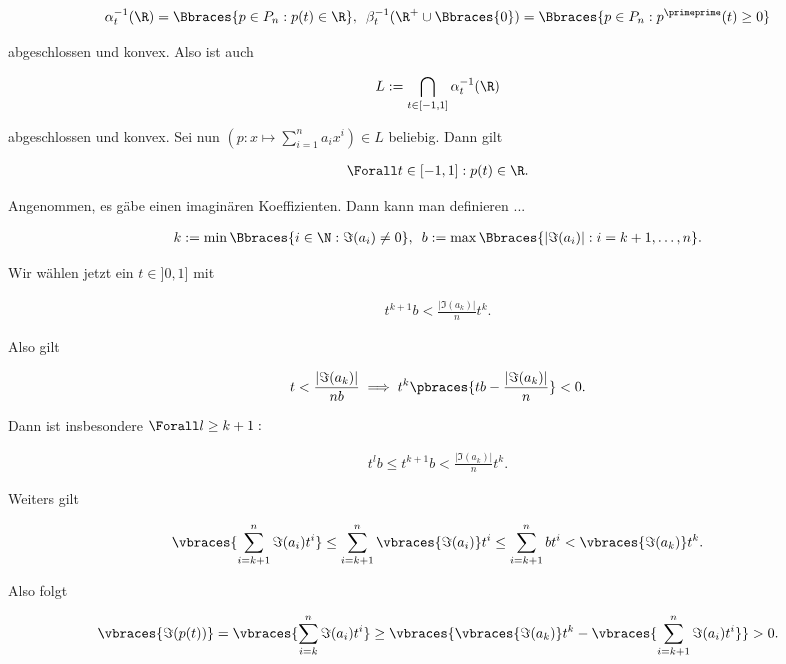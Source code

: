 \begin{solution}
\begin{align*}
  \alpha_t^{-1}(\R)
  =
  \Bbraces{p \in P_n: p(t) \in \R},
  \enspace
  \beta_t^{-1}(\R^+ \cup \Bbraces{0})
  =
  \Bbraces{p \in P_n: p^\primeprime(t) \geq 0}
\end{align*}

abgeschlossen und konvex.
Also ist auch

\begin{align*}
  L := \bigcap_{t \in [-1, 1]}\alpha_t^{-1}(\R)
\end{align*}

abgeschlossen und konvex.
Sei nun $(p: x \mapsto \sum_{i=1}^n a_i x^i) \in L$ beliebig.
Dann gilt

\begin{align*}
  \Forall t \in [-1, 1]: p(t) \in \R.
\end{align*}

Angenommen, es gäbe einen imaginären Koeffizienten.
Dann kann man definieren ...

\begin{align*}
  k := \min \Bbraces{i \in \N: \Im(a_i) \neq 0},
  \enspace
  b := \max \Bbraces{|\Im(a_i)|: i = k + 1, \dots, n}.
\end{align*}

Wir wählen jetzt ein $t \in ]0, 1]$ mit

\begin{align*}
  t^{k+1} b < \frac{|\Im(a_k)|}{n} t^k.
\end{align*}

Also gilt

\begin{align*}
  t < \frac{|\Im(a_k)|}{nb}
  \implies
  t^k \pbraces{tb - \frac{|\Im(a_k)|}{n}} < 0.
\end{align*}

Dann ist insbesondere $\Forall l \geq k + 1:$

\begin{align*}
  t^lb
  \leq
  t^{k+1}b
  <
  \frac{|\Im(a_k)|}{n}t^k.
\end{align*}

Weiters gilt

\begin{align*}
  \vbraces{\sum_{i = k + 1}^n \Im(a_i)t^i}
  \leq
  \sum_{i = k + 1}^n \vbraces{\Im(a_i)} t^i
  \leq
  \sum_{i = k+1}^n b t^i
  <
  \vbraces{\Im(a_k)} t^k.
\end{align*}

Also folgt

\begin{align*}
  \vbraces{\Im(p(t))}
  =
  \vbraces{\sum_{i = k}^n \Im(a_i)t^i}
  \geq
  \vbraces
  {
    \vbraces{\Im(a_k)} t^k -
    \vbraces{\sum_{i = k+1}^n \Im(a_i)t^i}
  } > 0.
\end{align*}


\end{solution}
